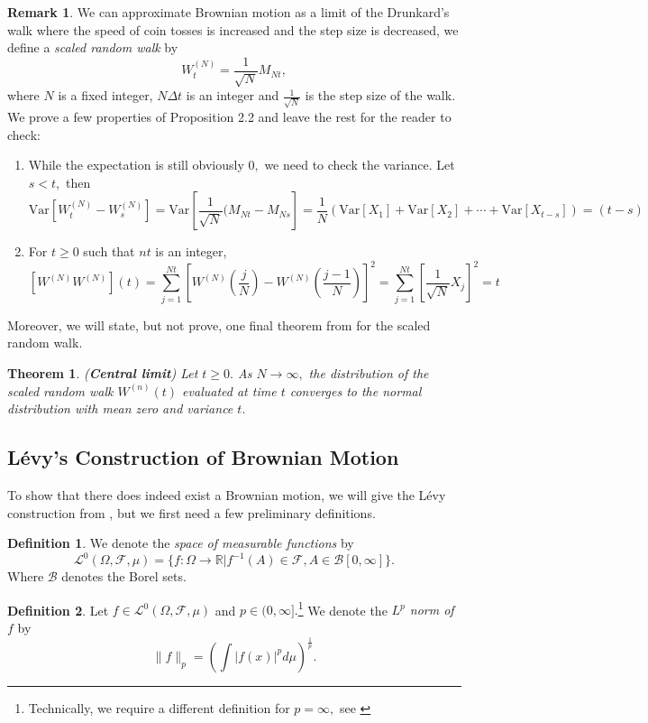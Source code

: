 \documentclass[openany, amssymb, psamsfonts]{amsart}
\newtheorem{thm}{Theorem}[section]
\theoremstyle{definition}
\newtheorem{defn}{Definition}[section]
\newtheorem{rem}{Remark}[section]
\numberwithin{equation}{section}
\newcommand{\bbR}{\mathbb{R}}
\newcommand{\Var}{\text{Var}}
\newcommand{\norm}[1]{\lVert #1 \rVert}
\begin{document}
\begin{rem} %
We can approximate Brownian motion as a limit of the Drunkard's walk where the speed of coin tosses is increased and the step size is decreased, we  define a \textit{scaled random walk} by \[W^{(N)}_{t} = \frac{1}{\sqrt{N}}M_{Nt},\] where $N$ is a fixed integer, $N\Delta t$ is an integer and $\frac{1}{\sqrt{N}}$ is the step size of the walk. \newline 
We prove a few properties of Proposition 2.2 and leave the rest for the reader to check: 
\begin{enumerate}
    \item While the expectation is still obviously $0,$ we need to check the variance. Let $s<t,$ then
        \[\Var[W^{(N)}_{t} - W^{(N)}_{s}] = \Var[\frac{1}{\sqrt{N}}(M_{Nt} - M_{Ns}] = \frac{1}{N}(\Var[X_1] + \Var[X_2] + \cdots + \Var[X_{t-s}]) = (t-s)\]
    \item For $t\geq 0$ such that $nt$ is an integer,
    \[[W^{(N)} W^{(N)}](t) = \sum_{j=1}^{Nt} \left[W^{(N)}\left(\frac{j}{N}\right) - W^{(N)}\left(\frac{j-1}{N}\right)\right]^2 = \sum_{j=1}^{Nt} \left[\frac{1}{\sqrt{N}}X_j\right]^2 = t\]
\end{enumerate}
Moreover, we will state, but not prove, one final theorem from \cite{Shreve} for the scaled random walk.
\begin{thm}
(\textbf{Central limit}) Let $t\geq 0.$ As $N\to \infty,$ the distribution of the scaled random walk $W^{(n)}(t)$ evaluated at time $t$ converges to the normal distribution with mean zero and variance $t.$
\end{thm}
\end{rem}

\subsection{Lévy’s Construction of Brownian Motion}
To show that there does indeed exist a Brownian motion, we will give the Lévy construction from \cite{SCA}, but we first need a few preliminary definitions.


\begin{defn}
We denote the \textit{space of measurable functions} by 
\[\mathcal{L}^0(\Omega, \mathcal{F}, \mu) = \{f: \Omega \to \bbR | f^{-1}(A) \in \mathcal{F}, A\in \mathcal{B}[0,\infty]\}.\] Where $\mathcal{B}$ denotes the Borel sets. 
\end{defn}

\begin{defn}
Let $f \in \mathcal{L}^0(\Omega, \mathcal{F}, \mu)$ and $p\in (0,\infty].$\footnote{Technically, we require a different definition for $p = \infty,$ see \cite{SCA}} We denote the \textit{$L^p$ norm of $f$} by 
\[\norm{f}_p = \left(\int |f(x)|^p d\mu \right)^\frac{1}{p}.\]
\end{defn}
\end{document}
